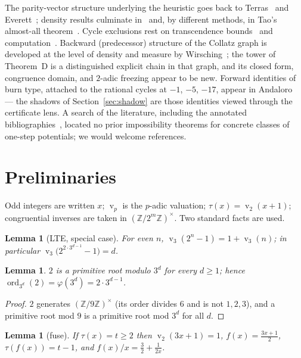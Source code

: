 \documentclass[11pt]{article}
\newtheorem{lemma}[theorem]{Lemma}
\theoremstyle{definition}
\theoremstyle{remark}
\newcommand{\Z}{\mathbb{Z}}
\newcommand{\ord}{\operatorname{ord}}
\DeclareMathOperator{\vv}{v}
\begin{document}
The parity-vector structure underlying the heuristic goes back to
Terras~\cite{Terras1976} and Everett~\cite{Everett1977}; density
results culminate in~\cite{KrasikovLagarias2003} and, by different
methods, in Tao's almost-all theorem~\cite{Tao2022}. Cycle exclusions
rest on transcendence bounds~\cite{Steiner1977,SimonsDeWeger2005} and
computation~\cite{Barina2021}. Backward (predecessor) structure of the
Collatz graph is developed at the level of density and measure by
Wirsching~\cite{Wirsching1998}; the tower of Theorem~D is a
distinguished explicit chain in that graph, and its closed form,
congruence domain, and $2$-adic freezing appear to be new. Forward
identities of burn type, attached to the rational cycles at $-1$, $-5$,
$-17$, appear in Andaloro~\cite{Andaloro2000} --- the shadows of
Section~\ref{sec:shadow} are those identities viewed through the
certificate lens. A search of the literature, including the annotated
bibliographies~\cite{LagariasBibI,LagariasBibII}, located no prior
impossibility theorems for concrete classes of one-step potentials; we
would welcome references.

\section{Preliminaries}\label{sec:prelim}

Odd integers are written $x$; $\vv_p$ is the $p$-adic valuation;
$\tau(x)=\vv_2(x+1)$; congruential inverses are taken in
$(\Z/2^m\Z)^{\times}$. Two standard facts are used.

\begin{lemma}[LTE, special case]\label{lem:lte}
For even $n$, $\vv_3(2^{n}-1)=1+\vv_3(n)$; in particular
$\vv_3\bigl(2^{2\cdot3^{d-1}}-1\bigr)=d$.
\end{lemma}

\begin{lemma}\label{lem:order}
$2$ is a primitive root modulo $3^d$ for every $d\ge1$; hence
$\ord_{3^d}(2)=\varphi(3^d)=2\cdot3^{d-1}$.
\end{lemma}

\begin{proof}
$2$ generates $(\Z/9\Z)^{\times}$ (its order divides $6$ and is not
$1,2,3$), and a primitive root mod $9$ is a primitive root mod $3^d$
for all $d$.
\end{proof}

\begin{lemma}[fuse]\label{lem:fuse}
If $\tau(x)=t\ge2$ then $\vv_2(3x+1)=1$, $f(x)=\tfrac{3x+1}{2}$,
$\tau(f(x))=t-1$, and $f(x)/x=\tfrac32+\tfrac1{2x}$.
\end{lemma}
\end{document}
